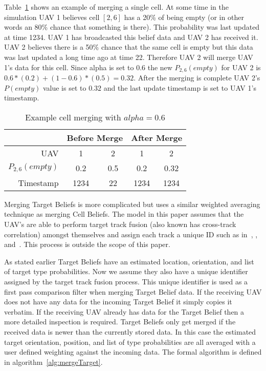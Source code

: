\begin{multicols}{2}
Table~\ref{tab:exampleCellMerge} shows an example of merging a single cell.  At some time in the simulation UAV 1 believes cell $[2, 6]$ has a 20\% of being empty (or in other words an 80\% chance that something is there). This probability was last updated at time 1234.  UAV 1 has broadcasted this belief data and UAV 2 has received it.  UAV 2 believes there is a 50\% chance that the same cell is empty but this data was last updated a long time ago at time 22.  Therefore UAV 2 will merge UAV 1's data for this cell.  Since alpha is set to 0.6 the new $P_{2,6}(empty)$ for UAV 2 is $0.6*(0.2) + (1-0.6)*(0.5)=0.32$.  After the merging is complete UAV 2's $P(empty)$ value is set to $0.32$ and the last update timestamp is set to UAV 1's timestamp.

\begin{table}[H]
	\caption{Example cell merging with $alpha=0.6$}
	\centering
	\label{tab:exampleCellMerge}
	\begin{tabular}{|r|c|c||c|c|}
		\hline
		                & \multicolumn{2}{c||}{Before Merge} & \multicolumn{2}{c|}{After Merge} \\
		\hline
		UAV             & 1   & 2                            & 1   & 2 \\
		\hline
		$P_{2,6}(empty)$& 0.2 & 0.5                          & 0.2 & 0.32 \\
		\hline
		Timestamp       & 1234& 22                           & 1234& 1234 \\
		\hline
	\end{tabular}
\end{table}

Merging Target Beliefs is more complicated but uses a similar weighted averaging technique as merging Cell Beliefs.  The model in this paper assumes that the UAV's are able to perform target track fusion (also known has cross-track correlation) amongst themselves and assign each track a unique ID such as in~\cite{stroupe}, \cite{barooah}, and~\cite{spillings}.  This process is outside the scope of this paper.

As stated earlier Target Beliefs have an estimated location, orientation, and list of target type probabilities.  Now we assume they also have a unique identifier assigned by the target track fusion process.  This unique identifier is used as a first pass comparison filter when merging Target Belief data.  If the receiving UAV does not have any data for the incoming Target Belief it simply copies it verbatim.  If the receiving UAV already has data for the Target Belief then a more detailed inspection is required.  Target Beliefs only get merged if the received data is newer than the currently stored data.  In this case the estimated target orientation, position, and list of type probabilities are all averaged with a user defined weighting against the incoming data.  The formal algorithm is defined in algorithm~\ref{alg:mergeTarget}.


\end{multicols}
